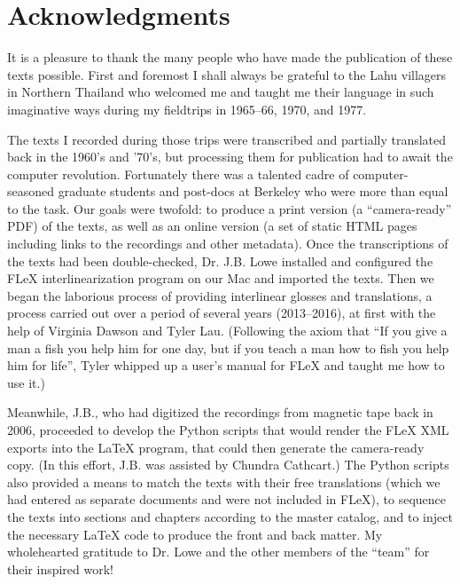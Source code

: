 \vspace{0.25em}

\renewcommand{\thefootnote}{\arabic{footnote}}
\setcounter{footnote}{0}

\section*{Acknowledgments}
It is a pleasure to thank the many people who have made the publication
of these texts possible. First and foremost I shall always be grateful
to the Lahu villagers in Northern Thailand who welcomed me and taught me
their language in such imaginative ways during my fieldtrips in 1965--66,
1970, and 1977.

The texts I recorded during those trips were transcribed and partially
translated back in the 1960's and '70's, but processing them for
publication had to await the computer revolution. Fortunately there
was a talented cadre of computer-seasoned graduate students and
post-docs at Berkeley who were more than equal to the task. Our goals
were twofold: to produce a print version (a ``camera-ready'' PDF) of
the texts, as well as an online version (a set of static HTML pages
including links to the recordings and other metadata). Once the
transcriptions of the texts had been double-checked, Dr. J.B. Lowe
installed and configured the FLeX interlinearization program on our Mac
and imported the texts. Then we began the laborious process of providing
interlinear glosses and translations, a process
carried out over a period of several years (2013--2016), at first with
the help of Virginia Dawson and Tyler Lau.  (Following the axiom that
``If you give a man a fish you help him for one day, but if you teach
a man how to fish you help him for life'', Tyler whipped up a user's
manual for FLeX and taught me how to use it.)

Meanwhile, J.B., who had digitized the recordings from magnetic tape back in 2006,
proceeded to develop the Python scripts that would render the FLeX XML
exports into the LaTeX program, that could then generate the
camera-ready copy. (In this effort, J.B. was assisted by Chundra
Cathcart.) The Python scripts also provided a means to match the texts
with their free translations (which we had entered as separate documents and were not included
in FLeX), to sequence the texts into sections and chapters according to
the master catalog, and to inject the necessary LaTeX code to produce
the front and back matter. My wholehearted gratitude to Dr. Lowe and the
other members of the ``team'' for their inspired work!

